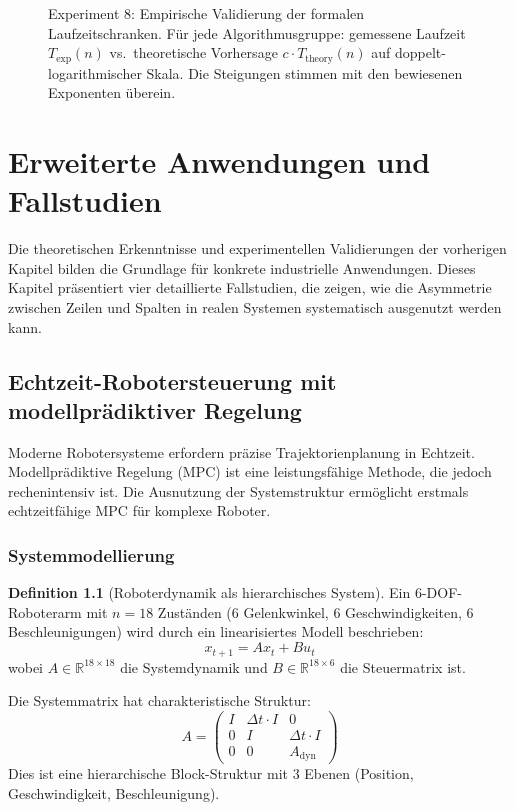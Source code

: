 \documentclass[a4paper,12pt]{report}
\theoremstyle{definition}
\newtheorem{definition}{Definition}
\begin{document}
	\begin{figure}[H]
		\centering
		\caption{Experiment 8: Empirische Validierung der formalen Laufzeitschranken. Für jede Algorithmusgruppe: gemessene Laufzeit $T_{\mathrm{exp}}(n)$ vs.\ theoretische Vorhersage $c \cdot T_{\mathrm{theory}}(n)$ auf doppelt-logarithmischer Skala. Die Steigungen stimmen mit den bewiesenen Exponenten überein.}
		\label{fig:exp8}
	\end{figure}

	\chapter{Erweiterte Anwendungen und Fallstudien}

	Die theoretischen Erkenntnisse und experimentellen Validierungen der vorherigen Kapitel bilden die Grundlage für konkrete industrielle Anwendungen. Dieses Kapitel präsentiert vier detaillierte Fallstudien, die zeigen, wie die Asymmetrie zwischen Zeilen und Spalten in realen Systemen systematisch ausgenutzt werden kann.
	
	\section{Echtzeit-Robotersteuerung mit modellprädiktiver Regelung}
	
	Moderne Robotersysteme erfordern präzise Trajektorienplanung in Echtzeit. Modellprädiktive Regelung (MPC) ist eine leistungsfähige Methode, die jedoch rechenintensiv ist. Die Ausnutzung der Systemstruktur ermöglicht erstmals echtzeitfähige MPC für komplexe Roboter.
	
	\subsection{Systemmodellierung}
	
	\begin{definition}[Roboterdynamik als hierarchisches System]
		Ein 6-DOF-Roboterarm mit $n = 18$ Zuständen (6 Gelenkwinkel, 6 Geschwindigkeiten, 6 Beschleunigungen) wird durch ein linearisiertes Modell beschrieben:
		\[
		x_{t+1} = A x_t + B u_t
		\]
		wobei $A \in \mathbb{R}^{18 \times 18}$ die Systemdynamik und $B \in \mathbb{R}^{18 \times 6}$ die Steuermatrix ist.
		
		Die Systemmatrix hat charakteristische Struktur:
		\[
		A = \begin{pmatrix}
			I & \Delta t \cdot I & 0 \\
			0 & I & \Delta t \cdot I \\
			0 & 0 & A_{\text{dyn}}
		\end{pmatrix}
		\]
		Dies ist eine hierarchische Block-Struktur mit 3 Ebenen (Position, Geschwindigkeit, Beschleunigung).
	\end{definition}
	
\end{document}
